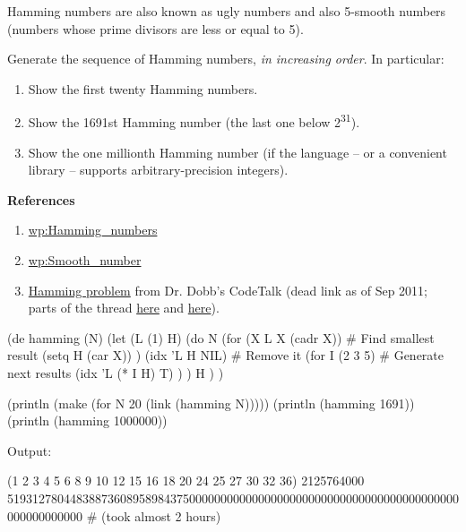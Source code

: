 Hamming numbers are also known as ugly numbers and also 5-smooth numbers
(numbers whose prime divisors are less or equal to 5).

Generate the sequence of Hamming numbers, \emph{in increasing order}. In
particular:

\begin{enumerate}
\item
  Show the first twenty Hamming numbers.
\item
  Show the 1691st Hamming number (the last one below
  2\textsuperscript{31}).
\item
  Show the one millionth Hamming number (if the language -- or a
  convenient library -- supports arbitrary-precision integers).
\end{enumerate}

\textbf{References}

\begin{enumerate}
\item
  \href{http://en.wikipedia.org/wiki/Hamming\_numbers}{wp:Hamming\_numbers}
\item
  \href{http://en.wikipedia.org/wiki/Smooth\_number}{wp:Smooth\_number}
\item
  \href{http://dobbscodetalk.com/index.php?option=com\_content\&task=view\&id=913\&Itemid=85}{Hamming
  problem} from Dr. Dobb's CodeTalk (dead link as of Sep 2011; parts of
  the thread
  \href{http://drdobbs.com/blogs/architecture-and-design/228700538}{here}
  and
  \href{http://www.jsoftware.com/jwiki/Essays/Hamming\%20Number}{here}).
\end{enumerate}



\begin{wideverbatim}

(de hamming (N)
   (let (L (1)  H)
      (do N
         (for (X L X (cadr X))      # Find smallest result
            (setq H (car X)) )
         (idx 'L H NIL)             # Remove it
         (for I (2 3 5)             # Generate next results
            (idx 'L (* I H) T) ) )
      H ) )

(println (make (for N 20 (link (hamming N)))))
(println (hamming 1691))
(println (hamming 1000000))

Output:

(1 2 3 4 5 6 8 9 10 12 15 16 18 20 24 25 27 30 32 36)
2125764000
519312780448388736089589843750000000000000000000000000000000000000000000000000000000
# (took almost 2 hours)

\end{wideverbatim}


